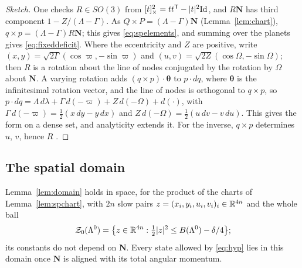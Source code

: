 \begin{proof}[Sketch]
One checks $R\in SO(3)$ from $[t]_\times^2=tt^{\mathsf T}-\lvert t\rvert^2\mathrm{Id}$, and $R\mathbf N$ has third component
$1-Z/(\Lambda-\Gamma)$. As $Q\times P=(\Lambda-\Gamma)\mathbf N$ (Lemma~\ref{lem:chart}), $q\times p=(\Lambda-\Gamma)
R\mathbf N$; this gives \eqref{eq:spelements}, and summing over the planets gives \eqref{eq:fixeddeficit}. Where
the eccentricity and $Z$ are positive, write $(x,y)=\sqrt{2\Gamma}(\cos\varpi,-\sin\varpi)$ and
$(u,v)=\sqrt{2Z}(\cos\Omega,-\sin\Omega)$; then $R$ is a rotation about the line of nodes conjugated by the rotation
by $\Omega$ about $\mathbf N$. A varying rotation adds $(q\times p)\cdot\boldsymbol\theta$ to $p\cdot dq$, where
$\boldsymbol\theta$ is the infinitesimal rotation vector, and the line of nodes is orthogonal to $q\times p$, so
$p\cdot dq=\Lambda\,d\lambda+\Gamma\,d(-\varpi)+Z\,d(-\Omega)+d(\cdot)$, with
$\Gamma\,d(-\varpi)=\frac12(x\,dy-y\,dx)$ and $Z\,d(-\Omega)=\frac12(u\,dv-v\,du)$. This gives the form on a dense
set, and analyticity extends it. For the inverse, $q\times p$ determines $u$, $v$, hence $R$ \cite{KAMnotes}.
\end{proof}

\subsection{The spatial domain}

\begin{lemma}\label{lem:spdomain}
Lemma~\ref{lem:domain} holds in space, for the product of the charts of Lemma~\ref{lem:spchart}, with $2n$ slow
pairs $z=(x_i,y_i,u_i,v_i)_i\in\mathbb{R}^{4n}$ and the whole ball
\begin{equation}\label{eq:spball}
  \mathcal Z_0(\Lambda^0)=\bigl\{z\in\mathbb{R}^{4n}:\tfrac12\lvert z\rvert^2\le B(\Lambda^0)-\delta/4\bigr\};
\end{equation}
its constants do not depend on $\mathbf N$. Every state allowed by \eqref{eq:hyp} lies in this domain once
$\mathbf N$ is aligned with its total angular momentum.
\end{lemma}

